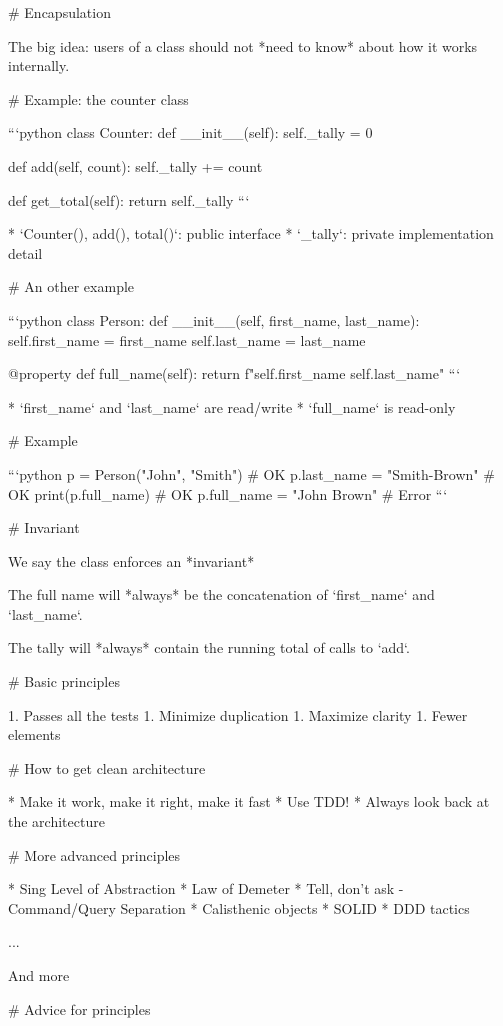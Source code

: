 # Encapsulation

The big idea: users of a class should not *need to know* about
how it works internally.

# Example: the counter class

```python
class Counter:
    def __init__(self):
        self._tally = 0

    def add(self, count):
        self._tally += count

    def get_total(self):
        return self._tally
```

* `Counter(), add(), total()`: public interface
* `_tally`: private implementation detail

# An other example

```python
class Person:
    def __init__(self, first_name, last_name):
        self.first_name = first_name
        self.last_name = last_name

    @property
    def full_name(self):
        return f"{self.first_name} {self.last_name}"
```

* `first_name` and `last_name` are read/write
* `full_name` is read-only

# Example

```python
p = Person("John", "Smith")  # OK
p.last_name = "Smith-Brown"  # OK
print(p.full_name)           # OK
p.full_name = "John Brown"   # Error
```

# Invariant

We say the class enforces an *invariant*

The full name will *always* be the concatenation of `first_name`
and `last_name`.

The tally will *always* contain the running total of calls to `add`.

# Basic principles

1. Passes all the tests
1. Minimize duplication
1. Maximize clarity
1. Fewer elements

# How to get clean architecture

* Make it work, make it right, make it fast
* Use TDD!
* Always look back at the architecture

# More advanced principles

* Sing Level of Abstraction
* Law of Demeter
* Tell, don't ask - Command/Query Separation
* Calisthenic objects
* SOLID
* DDD tactics

...

And more

# Advice for principles

